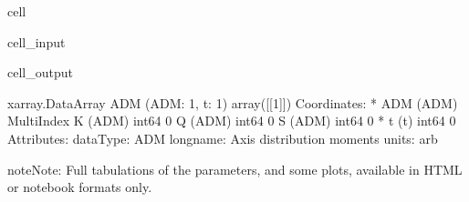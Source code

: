 \documentclass[letterpaper,table,10pt,english]{jupyterBook}
\begin{document}
\begin{sphinxuseclass}{cell}\begin{sphinxVerbatimInput}

\begin{sphinxuseclass}{cell_input}
\begin{sphinxVerbatim}[commandchars=\\\{\}]
\PYG{p}{[}\PYG{p}{]}\PYG{p}{[}\PYG{p}{]}
\end{sphinxVerbatim}

\end{sphinxuseclass}\end{sphinxVerbatimInput}
\begin{sphinxVerbatimOutput}

\begin{sphinxuseclass}{cell_output}
\begin{sphinxVerbatim}[commandchars=\\\{\}]
\PYGZlt{}xarray.DataArray \PYGZsq{}ADM\PYGZsq{} (ADM: 1, t: 1)\PYGZgt{}
array([[1]])
Coordinates:
  * ADM      (ADM) MultiIndex
  \PYGZhy{} K        (ADM) int64 0
  \PYGZhy{} Q        (ADM) int64 0
  \PYGZhy{} S        (ADM) int64 0
  * t        (t) int64 0
Attributes:
    dataType:   ADM
    long\PYGZus{}name:  Axis distribution moments
    units:      arb
\end{sphinxVerbatim}

\end{sphinxuseclass}\end{sphinxVerbatimOutput}

\end{sphinxuseclass}
\begin{sphinxShadowBox}
\sphinxstylesidebartitle{}

\begin{sphinxadmonition}{note}{Note:}
\sphinxAtStartPar
Full tabulations of the parameters, and some plots, available in HTML or notebook formats only.
\end{sphinxadmonition}
\end{sphinxShadowBox}
\end{document}
